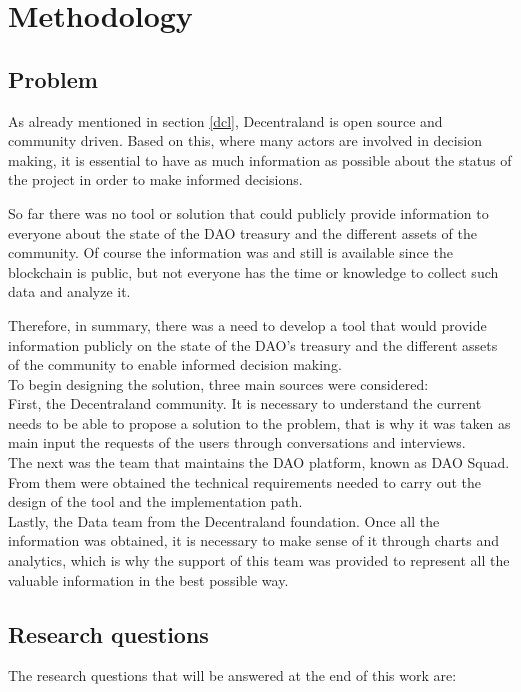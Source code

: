 \documentclass[MSE,Master,english]{twbook}%
\begin{document}
\chapter{Methodology\label{method}}
\section{Problem}
As already mentioned in section \ref{dcl}, Decentraland is open source and community driven. Based on this, where many actors are involved in decision making, it is essential to have as much information as possible about the status of the project in order to make informed decisions.

So far there was no tool or solution that could publicly provide information to everyone about the state of the DAO treasury and the different assets of the community. Of course the information was and still is available since the blockchain is public, but not everyone has the time or knowledge to collect such data and analyze it.

Therefore, in summary, there was a need to develop a tool that would provide information publicly on the state of the DAO's treasury and the different assets of the community to enable informed decision making. \\

To begin designing the solution, three main sources were considered: \\

First, the Decentraland community. It is necessary to understand the current needs to be able to propose a solution to the problem, that is why it was taken as main input the requests of the users through conversations and interviews. \\

The next was the team that maintains the DAO platform, known as DAO Squad. From them were obtained the technical requirements needed to carry out the design of the tool and the implementation path. \\

Lastly, the Data team from the Decentraland foundation. Once all the information was obtained, it is necessary to make sense of it through charts and analytics, which is why the support of this team was provided to represent all the valuable information in the best possible way.

\section{Research questions\label{research}}
The research questions that will be answered at the end of this work are: \\
\end{document}
